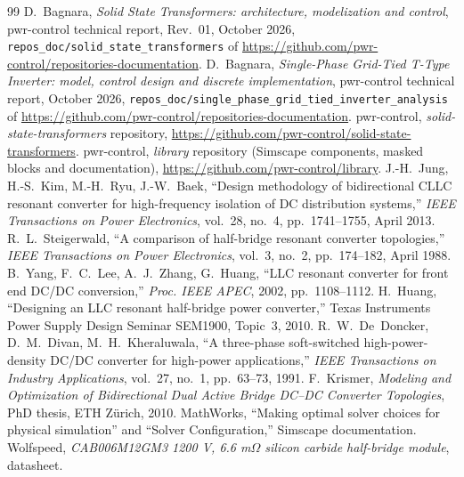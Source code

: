 \documentclass[12pt,a4paper]{scrartcl}
\newcommand{\code}[1]{\texttt{#1}}
\begin{document}
\begin{onehalfspace}
\begin{thebibliography}{99}
	 D.~Bagnara, \textit{Solid State Transformers: architecture, modelization and control}, pwr-control technical report, Rev.~01, October 2026, \code{repos\_doc/solid\_state\_transformers} of \url{https://github.com/pwr-control/repositories-documentation}.
	 D.~Bagnara, \textit{Single-Phase Grid-Tied T-Type Inverter: model, control design and discrete implementation}, pwr-control technical report, October 2026, \code{repos\_doc/single\_phase\_grid\_tied\_inverter\_analysis} of \url{https://github.com/pwr-control/repositories-documentation}.
	 pwr-control, \textit{solid-state-transformers} repository, \url{https://github.com/pwr-control/solid-state-transformers}.
	 pwr-control, \textit{library} repository (Simscape components, masked blocks and documentation), \url{https://github.com/pwr-control/library}.
	 J.-H.~Jung, H.-S.~Kim, M.-H.~Ryu, J.-W.~Baek, ``Design methodology of bidirectional CLLC resonant converter for high-frequency isolation of DC distribution systems,'' \textit{IEEE Transactions on Power Electronics}, vol.~28, no.~4, pp.~1741--1755, April 2013.
	 R.~L.~Steigerwald, ``A comparison of half-bridge resonant converter topologies,'' \textit{IEEE Transactions on Power Electronics}, vol.~3, no.~2, pp.~174--182, April 1988.
	 B.~Yang, F.~C.~Lee, A.~J.~Zhang, G.~Huang, ``LLC resonant converter for front end DC/DC conversion,'' \textit{Proc. IEEE APEC}, 2002, pp.~1108--1112.
	 H.~Huang, ``Designing an LLC resonant half-bridge power converter,'' Texas Instruments Power Supply Design Seminar SEM1900, Topic~3, 2010.
	 R.~W.~De~Doncker, D.~M.~Divan, M.~H.~Kheraluwala, ``A three-phase soft-switched high-power-density DC/DC converter for high-power applications,'' \textit{IEEE Transactions on Industry Applications}, vol.~27, no.~1, pp.~63--73, 1991.
	 F.~Krismer, \textit{Modeling and Optimization of Bidirectional Dual Active Bridge DC--DC Converter Topologies}, PhD thesis, ETH Z\"urich, 2010.
	 MathWorks, ``Making optimal solver choices for physical simulation'' and ``Solver Configuration,'' Simscape documentation.
	 Wolfspeed, \textit{CAB006M12GM3 1200 V, 6.6 m$\Omega$ silicon carbide half-bridge module}, datasheet.
\end{thebibliography}

\end{onehalfspace}
\end{document}
